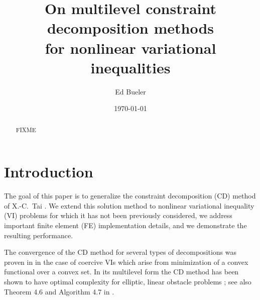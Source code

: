\documentclass[letterpaper,final,12pt,reqno]{amsart}
\theoremstyle{cstyle}
\theoremstyle{dstyle}
\numberwithin{equation}{section}
\numberwithin{figure}{section}
\numberwithin{table}{section}
\numberwithin{theorem}{section}
\begin{document}
\title[On multilevel constraint decomposition methods]{On multilevel constraint decomposition methods \\ for nonlinear variational inequalities}

\author{Ed Bueler}

\date{\today}

\begin{abstract} FIXME
\end{abstract}

\maketitle


\thispagestyle{empty}

\section{Introduction} \label{sec:intro}

The goal of this paper is to generalize the constraint decomposition (CD) method of X.-C.~Tai \cite{Tai2003}.  We extend this solution method to nonlinear variational inequality (VI) problems for which it has not been previously considered, we address important finite element (FE) implementation details, and we demonstrate the resulting performance.

The convergence of the CD method for several types of decompositions was proven in \cite{Tai2003} in the case of coercive VIs which arise from minimization of a convex functional over a convex set.  In its multilevel form the CD method has been shown to have optimal complexity for elliptic, linear obstacle problems \cite[subsection 5.4]{Tai2003}; see also Theorem 4.6 and Algorithm 4.7 in \cite{GraeserKornhuber2009}.
\end{document}
